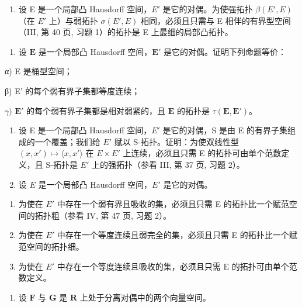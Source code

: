 \begin{enumerate}
\def\labelenumi{\alph{enumi})}
\setcounter{enumi}{1}
\tightlist
\item
  设 E 是一个局部凸 Hausdorff 空间，\(E'\) 是它的对偶。为使强拓扑 \(\beta(E', E)\)（在 \(E'\) 上）与弱拓扑 \(\sigma(E', E)\) 相同，必须且只需与 E 相伴的有界型空间（III, 第 40 页, 习题 1）的拓扑是 E 上最细的局部凸拓扑。
\end{enumerate}

\begin{enumerate}
\def\labelenumi{\arabic{enumi})}
\setcounter{enumi}{9}
\tightlist
\item
  设 \(\mathbf{E}\) 是一个局部凸 Hausdorff 空间，\(\mathbf{E}'\) 是它的对偶。证明下列命题等价：
\end{enumerate}

α) E 是桶型空间；

β) E' 的每个弱有界子集都等度连续；

\(\gamma)\) \(\mathbf{E}'\) 的每个弱有界子集都是相对弱紧的，且 \(\mathbf{E}\) 的拓扑是 \(\tau (\mathbf{E},\mathbf{E}')\)。

\begin{enumerate}
\def\labelenumi{\arabic{enumi})}
\setcounter{enumi}{10}
\item
  设 E 是一个局部凸 Hausdorff 空间，\(E'\) 是它的对偶，S 是由 E 的有界子集组成的一个覆盖；我们给 \(E'\) 赋以 S-拓扑。证明：为使双线性型 \((x, x') \mapsto \langle x, x' \rangle\) 在 \(E \times E'\) 上连续，必须且只需 E 的拓扑可由单个范数定义，且 S-拓扑是 \(E'\) 上的强拓扑（参看 III, 第 37 页, 习题 2）。
\item
  设 \(E\) 是一个局部凸 Hausdorff 空间，\(E'\) 是它的对偶。
\end{enumerate}

\begin{enumerate}
\def\labelenumi{\alph{enumi})}
\item
  为使在 \(E'\) 中存在一个弱有界且吸收的集，必须且只需 E 的拓扑比一个赋范空间的拓扑粗（参看 IV, 第 47 页, 习题 2）。
\item
  为使在 \(E'\) 中存在一个等度连续且弱完全的集，必须且只需 E 的拓扑比一个赋范空间的拓扑细。
\item
  为使在 \(E'\) 中存在一个等度连续且吸收的集，必须且只需 E 的拓扑可由单个范数定义。
\end{enumerate}

\begin{enumerate}
\def\labelenumi{\arabic{enumi})}
\setcounter{enumi}{12}
\tightlist
\item
  设 \(\mathbf{F}\) 与 \(\mathbf{G}\) 是 \(\mathbf{R}\) 上处于分离对偶中的两个向量空间。
\end{enumerate}

